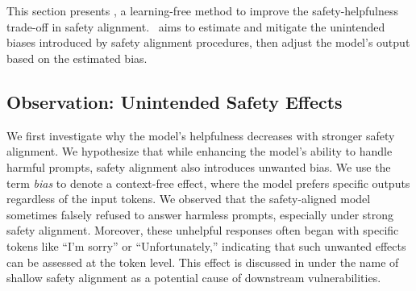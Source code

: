 \section{\algo}
\label{sec:method}
This section presents \algoshort, a learning-free method to improve the safety-helpfulness trade-off in safety alignment. \algoshort~aims to estimate and mitigate the unintended biases introduced by safety alignment procedures, then adjust the model's output based on the estimated bias.

\subsection{Observation: Unintended Safety Effects}
\label{sec:observation}



We first investigate why the model's helpfulness decreases with stronger safety alignment. We hypothesize that while enhancing the model's ability to handle harmful prompts, safety alignment also introduces unwanted bias. We use the term \textit{bias} to denote a context-free effect, where the model prefers specific outputs regardless of the input tokens. We observed that the safety-aligned model sometimes falsely refused to answer harmless prompts, especially under strong safety alignment. Moreover, these unhelpful responses often began with specific tokens like ``I’m sorry'' or ``Unfortunately,'' indicating that such unwanted effects can be assessed at the token level.
This effect is discussed in \citet{qi2024safety} under the name of shallow safety alignment as a potential cause of downstream vulnerabilities.

